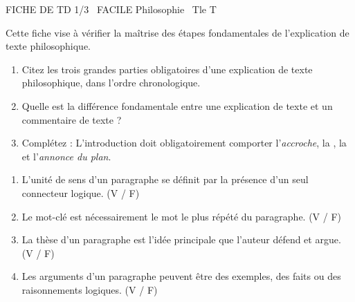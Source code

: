 \documentclass[11pt]{article}
\begin{document}
\begin{tcolorbox}[enhanced,colback=popink,colframe=popink,arc=10pt,boxrule=0pt,left=12pt,right=12pt,top=9pt,bottom=9pt]
{\color{white}\popxbold\small FICHE DE TD 1/3 \textbullet\ FACILE \hfill Philosophie \textbullet\ Tle T\par}
\end{tcolorbox}
\vspace{4pt}
Cette fiche vise à vérifier la maîtrise des étapes fondamentales de l'explication de texte philosophique.

\begin{exercice}
\begin{enumerate}
    \item Citez les trois grandes parties obligatoires d'une explication de texte philosophique, dans l'ordre chronologique.
    \item Quelle est la différence fondamentale entre une \og explication de texte \fg{} et un \og commentaire de texte \fg{} ?
    \item Complétez : L'introduction doit obligatoirement comporter l'\textit{accroche}, la \underline{\hspace{4cm}}, la \underline{\hspace{4cm}} et l'\textit{annonce du plan}.
\end{enumerate}
\end{exercice}

\begin{exercice}
\begin{enumerate}
    \item L'unité de sens d'un paragraphe se définit par la présence d'un seul connecteur logique. \hfill (V / F)
    \item Le \og mot-clé \fg{} est nécessairement le mot le plus répété du paragraphe. \hfill (V / F)
    \item La thèse d'un paragraphe est l'idée principale que l'auteur défend et argue. \hfill (V / F)
    \item Les arguments d'un paragraphe peuvent être des exemples, des faits ou des raisonnements logiques. \hfill (V / F)
\end{enumerate}
\end{exercice}
\end{document}
